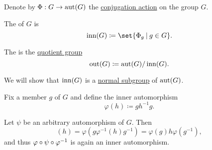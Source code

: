 \begin{definition}\label{def:inner_and_outer_automorphisms}
  Denote by \( \Phi: G \to \operatorname{aut}(G) \) the \hyperref[thm:group_conjugation_action]{conjugation action} on the group \( G \).

  The  of \( G \) is
  \begin{equation*}
    \op{inn}(G) \coloneqq \set{ \Phi_g \given g \in G }.
  \end{equation*}

  The  is the \hyperref[def:group/quotient]{quotient group}
  \begin{equation*}
    \operatorname{out}(G) \coloneqq \operatorname{aut}(G) / \operatorname{inn}(G).
  \end{equation*}
\end{definition}
\begin{defproof}
  We will show that \( \operatorname{inn}(G) \) is a \hyperref[thm:normal_subgroup_equivalences]{normal subgroup} of \( \operatorname{aut}(G) \).

  Fix a member \( g \) of \( G \) and define the inner automorphism
  \begin{equation*}
    \varphi(h) \coloneqq gh^{-1}g.
  \end{equation*}

  Let \( \psi \) be an arbitrary automorphism of \( G \). Then
  \begin{equation*}
    [\varphi \bincirc \psi \bincirc \varphi^{-1}](h)
    =
    \varphi(g \varphi^{-1}(h) g^{-1})
    =
    \varphi(g) h \varphi(g^{-1}),
  \end{equation*}
  and thus \( \varphi \bincirc \psi \bincirc \varphi^{-1} \) is again an inner automorphism.
\end{defproof}

